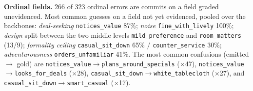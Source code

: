 \documentclass{article}
\begin{document}
\textbf{Ordinal fields.} 266 of 323 ordinal errors are commits on a field graded unevidenced.
Most common guesses on a field not yet evidenced, pooled over the backbones: \emph{deal-seeking}
\texttt{notices\_value} 87\%;
\emph{noise} \texttt{fine\_with\_lively} 100\%; \emph{design} split between the two middle
levels \texttt{mild\_preference} and \texttt{room\_matters} (13/9);
\emph{formality ceiling} \texttt{casual\_sit\_down} 65\% / \texttt{counter\_service} 30\%;
\emph{adventurousness} \texttt{orders\_unfamiliar} 41\%.
The most common confusions (emitted $\to$ gold) are \texttt{notices\_value}$\to$\texttt{plans\_around\_specials} ($\times$47),
\texttt{notices\_value}$\to$\texttt{looks\_for\_deals} ($\times$28),
\texttt{casual\_sit\_down}$\to$\texttt{white\_tablecloth} ($\times$27), and
\texttt{casual\_sit\_down}$\to$\texttt{smart\_casual} ($\times$17).
\end{document}
